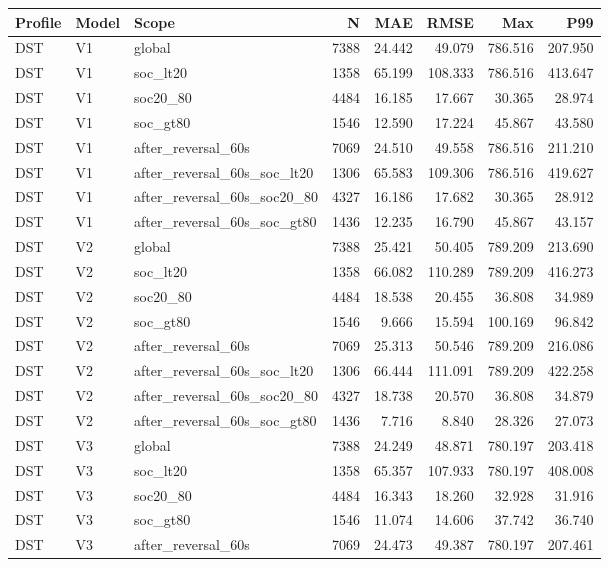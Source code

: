 \begin{tabular}{lllrrrrr}
\hline
Profile & Model & Scope & N & MAE & RMSE & Max & P99 \\
\hline
DST & V1 & global & 7388 & 24.442 & 49.079 & 786.516 & 207.950 \\
DST & V1 & soc\_lt20 & 1358 & 65.199 & 108.333 & 786.516 & 413.647 \\
DST & V1 & soc20\_80 & 4484 & 16.185 & 17.667 & 30.365 & 28.974 \\
DST & V1 & soc\_gt80 & 1546 & 12.590 & 17.224 & 45.867 & 43.580 \\
DST & V1 & after\_reversal\_60s & 7069 & 24.510 & 49.558 & 786.516 & 211.210 \\
DST & V1 & after\_reversal\_60s\_soc\_lt20 & 1306 & 65.583 & 109.306 & 786.516 & 419.627 \\
DST & V1 & after\_reversal\_60s\_soc20\_80 & 4327 & 16.186 & 17.682 & 30.365 & 28.912 \\
DST & V1 & after\_reversal\_60s\_soc\_gt80 & 1436 & 12.235 & 16.790 & 45.867 & 43.157 \\
DST & V2 & global & 7388 & 25.421 & 50.405 & 789.209 & 213.690 \\
DST & V2 & soc\_lt20 & 1358 & 66.082 & 110.289 & 789.209 & 416.273 \\
DST & V2 & soc20\_80 & 4484 & 18.538 & 20.455 & 36.808 & 34.989 \\
DST & V2 & soc\_gt80 & 1546 & 9.666 & 15.594 & 100.169 & 96.842 \\
DST & V2 & after\_reversal\_60s & 7069 & 25.313 & 50.546 & 789.209 & 216.086 \\
DST & V2 & after\_reversal\_60s\_soc\_lt20 & 1306 & 66.444 & 111.091 & 789.209 & 422.258 \\
DST & V2 & after\_reversal\_60s\_soc20\_80 & 4327 & 18.738 & 20.570 & 36.808 & 34.879 \\
DST & V2 & after\_reversal\_60s\_soc\_gt80 & 1436 & 7.716 & 8.840 & 28.326 & 27.073 \\
DST & V3 & global & 7388 & 24.249 & 48.871 & 780.197 & 203.418 \\
DST & V3 & soc\_lt20 & 1358 & 65.357 & 107.933 & 780.197 & 408.008 \\
DST & V3 & soc20\_80 & 4484 & 16.343 & 18.260 & 32.928 & 31.916 \\
DST & V3 & soc\_gt80 & 1546 & 11.074 & 14.606 & 37.742 & 36.740 \\
DST & V3 & after\_reversal\_60s & 7069 & 24.473 & 49.387 & 780.197 & 207.461 \\

\end{tabular}
